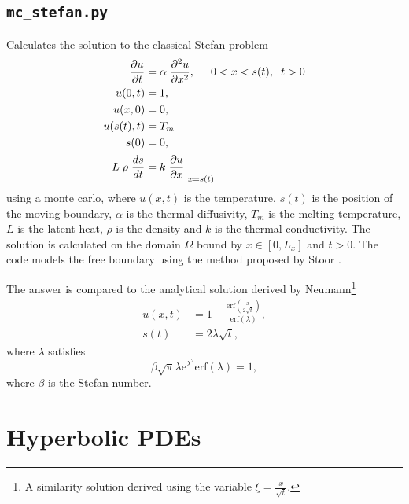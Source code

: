 \documentclass{article}
\begin{document}
\subsection{\texttt{mc\_stefan.py}}
Calculates the solution to the classical Stefan problem
\begin{align*}
\frac{\partial u}{\partial t} &= \alpha \hspace{0.1cm} \frac{\partial^2 u}{\partial x^2}, \hspace{0.5cm} 0 < x < s(t), \hspace{0.2cm} t > 0 \\
u(0,t)&=1,\\
u(x,0)&=0,\\
u(s(t),t)&=T_m\\
s(0)&=0,\\
L \hspace{0.1cm} \rho \hspace{0.1cm} \frac{ds}{dt} &= k \hspace{0.1cm} \frac{\partial u}{\partial x}\bigg|_{x=s(t)}
\end{align*}
using a monte carlo, where $u(x,t)$ is the temperature, $s(t)$ is the position of the moving boundary, $\alpha$ is the thermal diffusivity, $T_m$ is the melting temperature, $L$ is the latent heat, $\rho$ is the density and $k$ is the thermal conductivity. The solution is calculated on the domain $\Omega$ bound by $x \in [0,L_x]$ and $t > 0$. The code models the free boundary using the method proposed by Stoor \cite{stoor}. 
\newline 

The answer is compared to the analytical solution derived by Neumann\footnote{A similarity solution derived using the variable $\xi=\frac{x}{\sqrt{t}}$.}
\begin{align*}
u(x,t)&=1-\frac{\mathrm{erf} \left( \frac{x}{2\sqrt{t}} \right) }{ \mathrm{erf} \left( \lambda \right)}, \\
s(t)&=2 \lambda \sqrt{t},
\end{align*}
where $\lambda$ satisfies
\begin{equation}
\beta \sqrt{\pi}\lambda \mathrm{e}^{\lambda^2} \mathrm{erf} \left( \lambda \right) = 1,
\end{equation}
where $\beta$ is the Stefan number.

\section{Hyperbolic PDEs}
\end{document}
